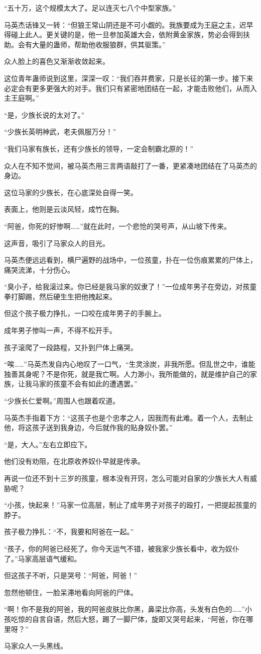 \begin{this_body}
“五十万，这个规模太大了。足以连灭七八个中型家族。”

马英杰话锋又一转：“但狼王常山阴还是不可小觑的。我族要成为王庭之主，迟早得碰上此人。更关键的是，他一旦参加英雄大会，依附黄金家族，势必会得到扶助。会有大量的蛊师，帮助他收服狼群，供其驱策。”

众人脸上的喜色又渐渐收敛起来。

这位青年蛊师说到这里，深深一叹：“我们吞并费家，只是长征的第一步。接下来必定会有更多更强大的对手。我们只有紧密地团结在一起，才能击败他们，从而入主王庭啊。”

“是，少族长说的太对了。”

“少族长英明神武，老夫佩服万分！”

“我们马家有族长，还有少族长的领导，一定会制霸北原的！”

众人在不知不觉间，被马英杰用三言两语敲打了一番，更紧凑地团结在了马英杰的身边。

这位马家的少族长，在心底深处自得一笑。

表面上，他则是云淡风轻，成竹在胸。

“阿爸，你死的好惨啊……”就在此时，一个悲怆的哭号声，从山坡下传来。

这声音，吸引了马家众人的目光。

马英杰便远远看到，横尸遍野的战场中，一位孩童，扑在一位伤痕累累的尸体上，痛哭流涕，十分伤心。

“臭小子，给我滚过来。你已经是我马家的奴隶了！”一位成年男子在旁边，对孩童拳打脚踢，然后硬生生把他拽起来。

但这个孩子极力挣扎，一口咬在成年男子的手腕上。

成年男子惨叫一声，不得不松开手。

孩子滚爬了一段路程，又扑到尸体上痛哭。

“唉……”马英杰发自内心地叹了一口气，“生灵涂炭，非我所愿。但乱世之中，谁能独善其身呢？不是你死，就是我亡啊。人力渺小，我所能做的，就是维护自己的家族，让我马家的孩童不会有如此的遭遇罢。”

“少族长仁爱啊。”周围人也跟着叹道。

马英杰手指着下方：“这孩子也是个忠孝之人，因我而有此难。着一个人，去制止他，将这孩子送到我身边，今后就作我的贴身奴仆罢。”

“是，大人。”左右立即应下。

他们没有劝阻，在北原收养奴仆早就是传承。

再说一位还不到十三岁的孩童，根本没有开窍，怎么可能对自家的少族长大人有威胁呢？

“小孩，快起来！”马家一位高层，制止了成年男子对孩子的殴打，一把提起孩童的脖子。

孩子极力挣扎：“不，我要和阿爸在一起。”

“孩子，你的阿爸已经死了。你今天运气不错，被我家少族长看中，收为奴仆了。”马家高层语气缓和。

但这孩子不听，只是哭号：“阿爸，阿爸！”

忽然他顿住，一脸呆滞地看向阿爸的尸体。

“啊！你不是我的阿爸，我的阿爸皮肤比你黑，鼻梁比你高，头发有白色的……”小孩吃惊的自言自语，然后大怒，踢了一脚尸体，旋即又哭号起来，“阿爸，你在哪里呀？”

马家众人一头黑线。

\end{this_body}

